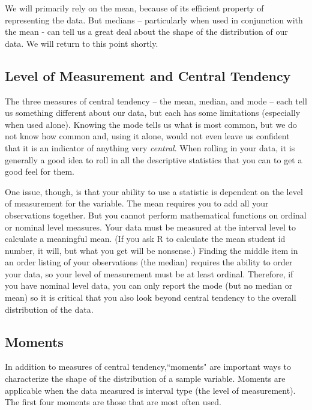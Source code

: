\documentclass[11pt,openany]{book}
\begin{document}
We will primarily rely on the mean, because of its efficient property of representing the data. But medians -- particularly when used in conjunction with the mean - can tell us a great deal about the shape of the distribution of our data. We will return to this point shortly.

\subsection{Level of Measurement and Central Tendency}

The three measures of central tendency --  the mean, median, and mode -- each tell us something different about our data, but each has some limitations (especially when used alone). Knowing the mode tells us what is most common, but we do not know how common and, using it alone, would not even leave us confident that it is an indicator of anything very \textit{central}. When rolling in your data, it is generally a good idea to roll in all the descriptive  statistics that you can to get a good feel for them.

One issue, though, is that your ability to use a statistic is dependent on the level of measurement for the variable.  The mean requires you to add all your observations together. But you cannot perform mathematical functions on ordinal or nominal level measures. Your data must be measured at the interval level to calculate a meaningful mean. (If you ask R to calculate the mean student id number, it will, but what you get will be nonsense.) Finding the middle item in an order listing of your observations (the median) requires the ability to order your data, so your level of measurement must be at least ordinal. Therefore, if you have nominal level data, you can only report the mode (but no median or mean) so it is critical that you also look beyond central tendency to the overall distribution of the data.

\subsection{Moments} 

In addition to measures of central tendency,``moments" are important ways to characterize the shape of the distribution of a sample variable. Moments are applicable when the data measured is interval type (the level of measurement). The first four moments are those that are most often used.  
\end{document}
